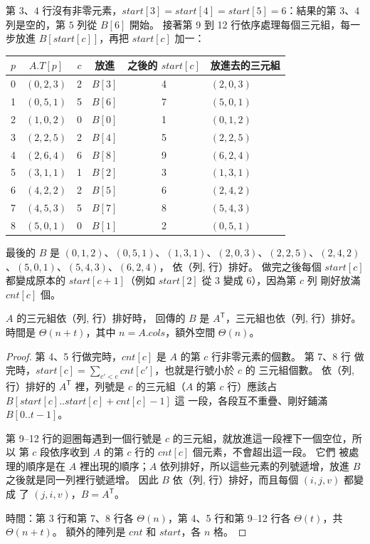 第 $3$、$4$ 行沒有非零元素，$\mathit{start}[3] = \mathit{start}[4] =
\mathit{start}[5] = 6$：結果的第 $3$、$4$ 列是空的，第 $5$ 列從 $B[6]$ 開始。 接著第
9 到 12 行依序處理每個三元組，每一步放進 $B[\mathit{start}[c]]$，再把
$\mathit{start}[c]$ 加一：

\begin{center}
\begin{tabular}{cccccl}
\toprule
$p$ & $A.T[p]$ & $c$ & 放進 & 之後的 $\mathit{start}[c]$ & 放進去的三元組 \\
\midrule
0 & $(0,2,3)$ & 2 & $B[3]$ & 4 & $(2,0,3)$ \\
1 & $(0,5,1)$ & 5 & $B[6]$ & 7 & $(5,0,1)$ \\
2 & $(1,0,2)$ & 0 & $B[0]$ & 1 & $(0,1,2)$ \\
3 & $(2,2,5)$ & 2 & $B[4]$ & 5 & $(2,2,5)$ \\
4 & $(2,6,4)$ & 6 & $B[8]$ & 9 & $(6,2,4)$ \\
5 & $(3,1,1)$ & 1 & $B[2]$ & 3 & $(1,3,1)$ \\
6 & $(4,2,2)$ & 2 & $B[5]$ & 6 & $(2,4,2)$ \\
7 & $(4,5,3)$ & 5 & $B[7]$ & 8 & $(5,4,3)$ \\
8 & $(5,0,1)$ & 0 & $B[1]$ & 2 & $(0,5,1)$ \\
\bottomrule
\end{tabular}
\end{center}

最後的 $B$ 是
$(0,1,2)$、$(0,5,1)$、$(1,3,1)$、$(2,0,3)$、$(2,2,5)$、$(2,4,2)$、$(5,0,1)$、$(5,4,3)$、$(6,2,4)$，
依（列, 行）排好。 做完之後每個 $\mathit{start}[c]$ 都變成原本的
$\mathit{start}[c + 1]$（例如 $\mathit{start}[2]$ 從 $3$ 變成 $6$），因為第 $c$ 列
剛好放滿 $\mathit{cnt}[c]$ 個。

\begin{theorem}
\label{thm:arr-fast-transpose}
$A$ 的三元組依（列, 行）排好時， 回傳的 $B$ 是
$A^{\mathsf T}$，三元組也依（列, 行）排好。 時間是 $\Theta(n + t)$，其中 $n =
A.\mathit{cols}$，額外空間 $\Theta(n)$。
\end{theorem}

\begin{proof}
第 4、5 行做完時，$\mathit{cnt}[c]$ 是 $A$ 的第 $c$ 行非零元素的個數。 第 7、8 行
做完時，$\mathit{start}[c] = \sum_{c' < c} \mathit{cnt}[c']$，也就是行號小於 $c$ 的
三元組個數。 依（列, 行）排好的 $A^{\mathsf T}$ 裡，列號是 $c$ 的三元組（$A$ 的第
$c$ 行）應該占 $B[\mathit{start}[c] .. \mathit{start}[c] + \mathit{cnt}[c] - 1]$ 這
一段，各段互不重疊、剛好鋪滿 $B[0..t-1]$。

第 9--12 行的迴圈每遇到一個行號是 $c$ 的三元組，就放進這一段裡下一個空位，所以
第 $c$ 段依序收到 $A$ 的第 $c$ 行的 $\mathit{cnt}[c]$ 個元素，不會超出這一段。 它們
被處理的順序是在 $A$ 裡出現的順序；$A$ 依列排好，所以這些元素的列號遞增，放進 $B$
之後就是同一列裡行號遞增。 因此 $B$ 依（列, 行）排好，而且每個 $(i, j, v)$ 都變成
了 $(j, i, v)$，$B = A^{\mathsf T}$。

時間：第 3 行和第 7、8 行各 $\Theta(n)$，第 4、5 行和第 9--12 行各 $\Theta(t)$，共
$\Theta(n + t)$。 額外的陣列是 $\mathit{cnt}$ 和 $\mathit{start}$，各 $n$ 格。
\end{proof}

